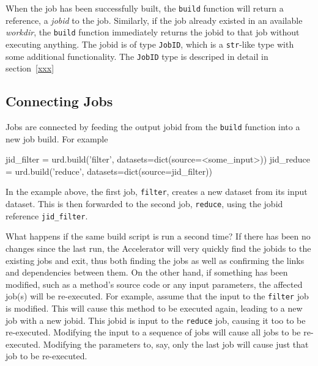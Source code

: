 When the job has been successfully built, the \texttt{build} function
will return a reference, a \textsl{jobid} to the job.  Similarly, if
the job already existed in an available \textsl{workdir}, the
\texttt{build} function immediately returns the jobid to that job
without executing anything.  The jobid is of type \texttt{JobID},
which is a \texttt{str}-like type with some additional functionality.
The \texttt{JobID} type is descriped in detail in section~\ref{xxx}



\subsection{Connecting Jobs}
Jobs are connected by feeding the output jobid from the \texttt{build}
function into a new job build.  For example
\begin{python}
jid_filter = urd.build('filter', datasets=dict(source=<some_input>))
jid_reduce = urd.build('reduce', datasets=dict(source=jid_filter))
\end{python}
In the example above, the first job, \texttt{filter}, creates a new
dataset from its input dataset.  This is then forwarded to the second
job, \texttt{reduce}, using the jobid reference \texttt{jid\_filter}.

What happens if the same build script is run a second time?  If there
has been no changes since the last run, the Accelerator will very
quickly find the jobids to the existing jobs and exit, thus both
finding the jobs as well as confirming the links and dependencies
between them.  On the other hand, if something has been modified, such
as a method's source code or any input parameters, the affected job(s)
will be re-executed.  For example, assume that the input to
the \texttt{filter} job is modified.  This will cause this method to
be executed again, leading to a new job with a new jobid.  This jobid
is input to the \texttt{reduce} job, causing it too to be re-executed.
Modifying the input to a sequence of jobs will cause all jobs to be
re-executed.  Modifying the parameters to, say, only the last job will
cause just that job to be re-executed.



